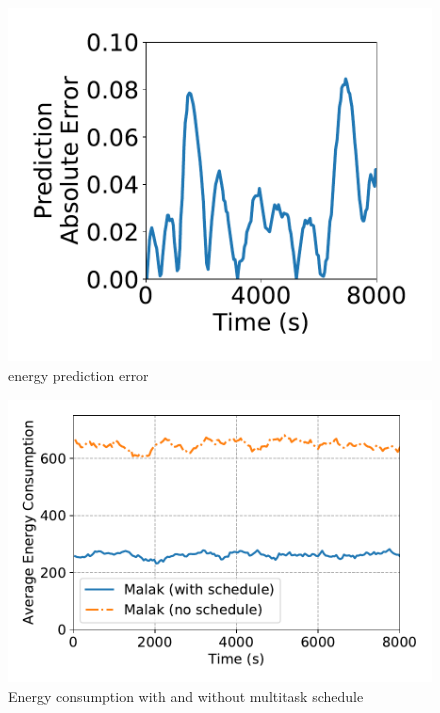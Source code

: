 \begin{figure}[htbp]
	\centering
	\includegraphics[width=.85\columnwidth]{Figure/energy_pred_err}
	\vspace{-0.1in}
	\caption{energy prediction error}
	\label{energy_pred_err}
	\vspace{-0.2in}
\end{figure}
\begin{figure}[htbp]
	\centering
	\includegraphics[width=.85\columnwidth]{Figure/multitask_energy}
	\vspace{-0.1in}
	\caption{Energy consumption with and without multitask schedule}
	\label{multitask_energy}
	\vspace{-0.2in}
\end{figure}
